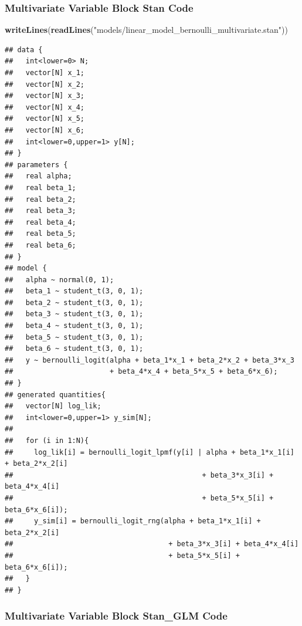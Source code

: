 \documentclass[
]{article}
\newenvironment{Shaded}{\begin{snugshade}}{\end{snugshade}}
\newcommand{\KeywordTok}[1]{\textcolor[rgb]{0.13,0.29,0.53}{\textbf{#1}}}
\newcommand{\NormalTok}[1]{#1}
\newcommand{\StringTok}[1]{\textcolor[rgb]{0.31,0.60,0.02}{#1}}
\begin{document}
\hypertarget{multivariate-variable-block-stan-code}{%
\subsubsection{Multivariate Variable Block Stan
Code}\label{multivariate-variable-block-stan-code}}

\begin{Shaded}
\begin{Highlighting}[]
\KeywordTok{writeLines}\NormalTok{(}\KeywordTok{readLines}\NormalTok{(}\StringTok{"models/linear_model_bernoulli_multivariate.stan"}\NormalTok{))}
\end{Highlighting}
\end{Shaded}

\begin{verbatim}
## data {
##   int<lower=0> N;
##   vector[N] x_1;
##   vector[N] x_2;
##   vector[N] x_3;
##   vector[N] x_4;
##   vector[N] x_5;
##   vector[N] x_6;
##   int<lower=0,upper=1> y[N];
## }
## parameters {
##   real alpha;
##   real beta_1;
##   real beta_2;
##   real beta_3;
##   real beta_4;
##   real beta_5;
##   real beta_6;
## }
## model {
##   alpha ~ normal(0, 1);
##   beta_1 ~ student_t(3, 0, 1);
##   beta_2 ~ student_t(3, 0, 1);
##   beta_3 ~ student_t(3, 0, 1);
##   beta_4 ~ student_t(3, 0, 1);
##   beta_5 ~ student_t(3, 0, 1);
##   beta_6 ~ student_t(3, 0, 1);
##   y ~ bernoulli_logit(alpha + beta_1*x_1 + beta_2*x_2 + beta_3*x_3
##                       + beta_4*x_4 + beta_5*x_5 + beta_6*x_6);
## }
## generated quantities{
##   vector[N] log_lik;
##   int<lower=0,upper=1> y_sim[N];
##   
##   for (i in 1:N){
##     log_lik[i] = bernoulli_logit_lpmf(y[i] | alpha + beta_1*x_1[i] + beta_2*x_2[i] 
##                                             + beta_3*x_3[i] + beta_4*x_4[i]
##                                             + beta_5*x_5[i] + beta_6*x_6[i]);
##     y_sim[i] = bernoulli_logit_rng(alpha + beta_1*x_1[i] + beta_2*x_2[i]
##                                     + beta_3*x_3[i] + beta_4*x_4[i]
##                                     + beta_5*x_5[i] + beta_6*x_6[i]);
##   }
## }
\end{verbatim}

\hypertarget{multivariate-variable-block-stan_glm-code}{%
\subsubsection{Multivariate Variable Block Stan\_GLM
Code}\label{multivariate-variable-block-stan_glm-code}}
\end{document}
